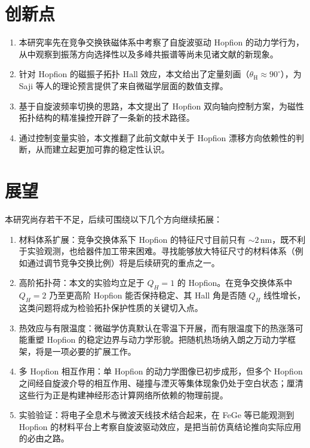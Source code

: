 \documentclass{article}
\begin{document}
\section{创新点}

\begin{enumerate}[label=(\arabic*)]
  \item 本研究率先在竞争交换铁磁体系中考察了自旋波驱动 Hopfion 的动力学行为，从中观察到振荡方向选择性以及多峰共振谱等尚未见诸文献的新现象。
  \item 针对 Hopfion 的磁振子拓扑 Hall 效应，本文给出了定量刻画（$\theta_{\text{H}} \approx 90^{\circ}$），为 Saji 等人的理论预言提供了来自微磁学层面的数值支撑。
  \item 基于自旋波频率切换的思路，本文提出了 Hopfion 双向轴向控制方案，为磁性拓扑结构的精准操控开辟了一条新的技术路径。
  \item 通过控制变量实验，本文推翻了此前文献中关于 Hopfion 漂移方向依赖性的判断，从而建立起更加可靠的稳定性认识。
\end{enumerate}


\section{展望}

本研究尚存若干不足，后续可围绕以下几个方向继续拓展：

\begin{enumerate}[label=(\arabic*)]
  \item 材料体系扩展：竞争交换体系下 Hopfion 的特征尺寸目前只有 $\sim2\,\mathrm{nm}$，既不利于实验观测，也给器件加工带来困难。寻找能够放大特征尺寸的材料体系（例如通过调节竞争交换比例）将是后续研究的重点之一。
  \item 高阶拓扑荷：本文的实验均立足于 $Q_H = 1$ 的 Hopfion。在竞争交换体系中 $Q_H = 2$ 乃至更高阶 Hopfion 能否保持稳定、其 Hall 角是否随 $Q_H$ 线性增长，这类问题将成为检验拓扑保护性质的关键切入点。
  \item 热效应与有限温度：微磁学仿真默认在零温下开展，而有限温度下的热涨落可能重塑 Hopfion 的稳定边界与动力学形貌。把随机热场纳入朗之万动力学框架，将是一项必要的扩展工作。
  \item 多 Hopfion 相互作用：单 Hopfion 的动力学图像已初步成形，但多个 Hopfion 之间经自旋波介导的相互作用、碰撞与湮灭等集体现象仍处于空白状态；厘清这些行为正是构建神经形态计算网络所依赖的物理前提。
  \item 实验验证：将电子全息术与微波天线技术结合起来，在 FeGe 等已能观测到 Hopfion 的材料平台上考察自旋波驱动效应，是把当前仿真结论推向实际应用的必由之路。
\end{enumerate}
\end{document}
